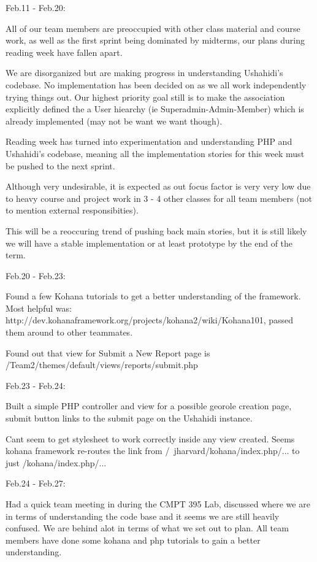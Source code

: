 \documentclass{article}
\begin{document}
Feb.11 - Feb.20:

    All of our team members are preoccupied with other class material and course work, as well as the first sprint being dominated by midterms, our plans during reading week have fallen apart.

    We are disorganized but are making progress in understanding Ushahidi's codebase.  No implementation has been decided on as we all work independently trying things out.  Our highest priority goal still is to make the association explicitly defined the a User hiearchy (ie Superadmin-Admin-Member) which is already implemented (may not be want we want though).
		    
    Reading week has turned into experimentation and understanding PHP and Ushahidi's codebase, meaning all the implementation stories for this week must be pushed to the next sprint.

    Although very undesirable, it is expected as out focus factor is very very low due to heavy course and project work in 3 - 4 other classes for all team members (not to mention external responsibities).
	     
    This will be a reoccuring trend of pushing back main stories, but it is still likely we will have a stable implementation or at least prototype by the end of the term.
	
Feb.20 - Feb.23:

    Found a few Kohana tutorials to get a better understanding of the framework.  Most helpful was: http://dev.kohanaframework.org/projects/kohana2/wiki/Kohana101, passed them around to other teammates.

    Found out that view for Submit a New Report page is /Team2/themes/default/views/reports/submit.php
	
Feb.23 - Feb.24:

    Built a simple PHP controller and view for a possible georole creation page, submit button links to the submit page on the Ushahidi instance.
	
    Cant seem to get stylesheet to work correctly inside any view created.
    Seems kohana framework re-routes the link from /~jharvard/kohana/index.php/... to just /kohana/index.php/...
	
Feb.24 - Feb.27:

    Had a quick team meeting in during the CMPT 395 Lab, discussed where we are in terms of understanding the code base and it seems we are still heavily confused.  We are behind alot in terms of what we set out to plan.  All team members have done some kohana and php tutorials to gain a better understanding.
	
\end{document}
